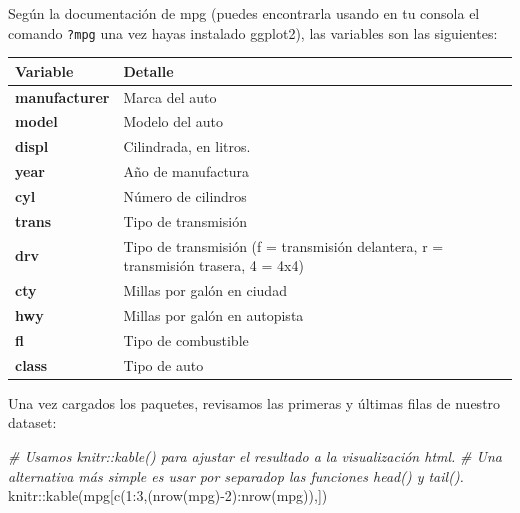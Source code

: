 \documentclass[
]{book}
\newenvironment{Shaded}{\begin{snugshade}}{\end{snugshade}}
\newcommand{\CommentTok}[1]{\textcolor[rgb]{0.56,0.35,0.01}{\textit{#1}}}
\newcommand{\DecValTok}[1]{\textcolor[rgb]{0.00,0.00,0.81}{#1}}
\newcommand{\FunctionTok}[1]{\textcolor[rgb]{0.00,0.00,0.00}{#1}}
\newcommand{\NormalTok}[1]{#1}
\newcommand{\SpecialCharTok}[1]{\textcolor[rgb]{0.00,0.00,0.00}{#1}}
\begin{document}
Según la documentación de mpg (puedes encontrarla usando en tu consola el comando \texttt{?mpg} una vez hayas instalado ggplot2), las variables son las siguientes:

\begin{longtable}[]{@{}
  >{\centering\arraybackslash}p{}
  >{\raggedright\arraybackslash}p{}@{}}
\toprule
Variable & Detalle \\
\midrule
\endhead
\textbf{manufacturer} & Marca del auto \\
\textbf{model} & Modelo del auto \\
\textbf{displ} & Cilindrada, en litros. \\
\textbf{year} & Año de manufactura \\
\textbf{cyl} & Número de cilindros \\
\textbf{trans} & Tipo de transmisión \\
\textbf{drv} & Tipo de transmisión (f = transmisión delantera, r = transmisión trasera, 4 = 4x4) \\
\textbf{cty} & Millas por galón en ciudad \\
\textbf{hwy} & Millas por galón en autopista \\
\textbf{fl} & Tipo de combustible \\
\textbf{class} & Tipo de auto \\
\bottomrule
\end{longtable}

Una vez cargados los paquetes, revisamos las primeras y últimas filas de nuestro dataset:

\begin{Shaded}
\begin{Highlighting}[]
\CommentTok{\# Usamos knitr::kable() para ajustar el resultado a la visualización html.}
\CommentTok{\# Una alternativa más simple es usar por separadop las funciones head() y tail().}
\NormalTok{knitr}\SpecialCharTok{::}\FunctionTok{kable}\NormalTok{(mpg[}\FunctionTok{c}\NormalTok{(}\DecValTok{1}\SpecialCharTok{:}\DecValTok{3}\NormalTok{,(}\FunctionTok{nrow}\NormalTok{(mpg)}\SpecialCharTok{{-}}\DecValTok{2}\NormalTok{)}\SpecialCharTok{:}\FunctionTok{nrow}\NormalTok{(mpg)),])}
\end{Highlighting}
\end{Shaded}
\end{document}
